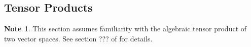 \documentclass[12pt]{amsart}
\theoremstyle{definition}
\newtheorem{defn}[definition]{Definition}
\newtheorem{note}[definition]{Note}
\newcommand{\del}{\delta}
\newcommand{\N}{\mathbb{N}}
\DeclareMathOperator*{\0}{\mbf{0}}
\DeclareMathOperator*{\1}{\mbf{1}}
\newcommand{\ld}[1]{\label{defn:#1}}
\begin{document}
%
%



















\newpage
	\subsection{Tensor Products}
	
	\begin{note}
	This section assumes familiarity with the algebraic tensor product of two vector spaces. See section ??? of \cite{algebra} for details. 
	\end{note}	
	
\end{document}
